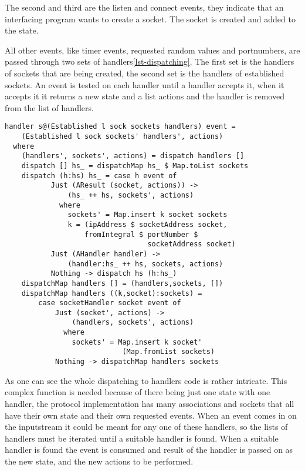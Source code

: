 The second and third are the listen and connect events, they indicate that an interfacing program wants to create a socket. The socket is created and added to the state.

All other events, like timer events, requested random values and portnumbers, are passed through two sets of handlers\ref{lst-dispatching}. The first set is the handlers of sockets that are being created, the second set is the handlers of established sockets. An event is tested on each handler until a handler accepts it, when it accepts it it returns a new state and a list actions and the handler is removed from the list of handlers.

\begin{lstlisting}[caption={Dispatching to handlers},label={lst-dispatching}]
handler s@(Established l sock sockets handlers) event =
    (Established l sock sockets' handlers', actions)
  where
    (handlers', sockets', actions) = dispatch handlers []
    dispatch [] hs_ = dispatchMap hs_ $ Map.toList sockets
    dispatch (h:hs) hs_ = case h event of
           Just (AResult (socket, actions)) ->
               (hs_ ++ hs, sockets', actions)
             where
               sockets' = Map.insert k socket sockets
               k = (ipAddress $ socketAddress socket,
                   fromIntegral $ portNumber $
                                  socketAddress socket)
           Just (AHandler handler) ->
               (handler:hs_ ++ hs, sockets, actions)
           Nothing -> dispatch hs (h:hs_)
    dispatchMap handlers [] = (handlers,sockets, [])
    dispatchMap handlers ((k,socket):sockets) =
        case socketHandler socket event of
            Just (socket', actions) -> 
                (handlers, sockets', actions)
              where
                sockets' = Map.insert k socket'
                            (Map.fromList sockets)
            Nothing -> dispatchMap handlers sockets
\end{lstlisting}

As one can see the whole dispatching to handlers code is rather intricate. This complex function is needed because of there being just one state with one handler, the protocol implementation has many associations and sockets that all have their own state and their own requested events.
When an event comes in on the inputstream it could be meant for any one of these handlers, so the lists of handlers must be iterated until a suitable handler is found. 
When a suitable handler is found the event is consumed and result of the handler is passed on as the new state, and the new actions to be performed.

